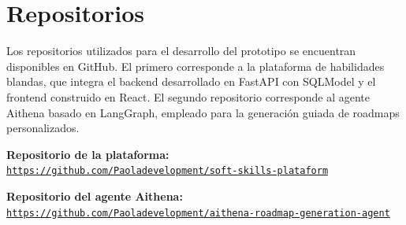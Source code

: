 \section{Repositorios}

Los repositorios utilizados para el desarrollo del prototipo se encuentran disponibles en GitHub. El primero corresponde a la plataforma de habilidades blandas, que integra el backend desarrollado en FastAPI con SQLModel y el frontend construido en React. El segundo repositorio corresponde al agente Aithena basado en LangGraph, empleado para la generación guiada de roadmaps personalizados.

\medskip

\textbf{Repositorio de la plataforma:}\\
\href{https://github.com/Paoladevelopment/soft-skills-plataform}{\texttt{https://github.com/Paoladevelopment/soft-skills-plataform}}

\medskip

\textbf{Repositorio del agente Aithena:}\\
\href{https://github.com/Paoladevelopment/aithena-roadmap-generation-agent}{\texttt{https://github.com/Paoladevelopment/aithena-roadmap-generation-agent}}



